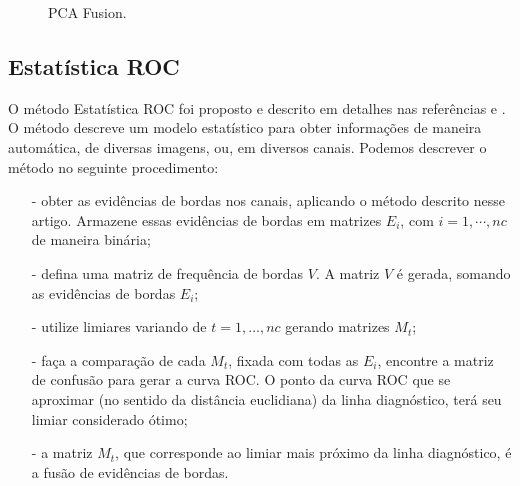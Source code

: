 \documentclass[conference]{IEEEtran}
\begin{document}
	\begin{figure}[htb!]
	\caption{PCA Fusion.}
\label{fig6}
\end{figure}




\subsection{Estatística ROC}
O método Estatística ROC foi proposto e descrito em detalhes nas referências \cite{gs} e \cite{fawcett}. O método descreve um modelo estatístico para obter informações de maneira automática, de diversas imagens, ou, em diversos canais. Podemos descrever o método no seguinte procedimento:
\begin{itemize}
\item[-] obter as evidências de bordas nos canais, aplicando o método descrito nesse artigo. Armazene essas evidências de bordas em matrizes $E_i$, com $i=1,\cdots,nc$ de maneira binária;
\item[-] defina uma matriz de frequência de bordas $V$. A matriz  $V$ é gerada, somando as evidências de bordas $E_i$;
\item[-] utilize limiares variando de $t=1,\dots,nc$ gerando matrizes $M_t$;
\item[-] faça a comparação de cada $M_t$, fixada com todas as $E_i$,  encontre a matriz de confusão para gerar a curva ROC. O ponto da curva ROC que se aproximar (no sentido da distância euclidiana) da linha diagnóstico, terá seu limiar considerado ótimo;
\item[-] a matriz $M_t$, que corresponde ao limiar mais próximo da linha diagnóstico, é a fusão de evidências de bordas.
\end{itemize}
  
\end{document}
